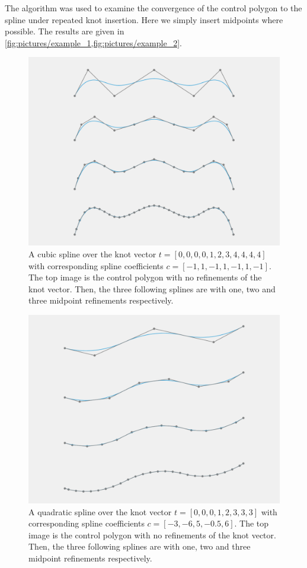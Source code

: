 \documentclass{article}
\begin{document}
    The algorithm was used to examine the convergence of the control polygon to
    the spline under repeated knot insertion. Here we simply insert midpoints
    where possible. The results are given in
    \cref{fig:pictures/example_1,fig:pictures/example_2}.
    \begin{figure}[htpb]
        \centering
        \includegraphics[width=0.8\linewidth]{pictures/example_1.pdf}
        \caption{
            A cubic spline over the knot vector $t = [0, 0, 0, 0, 1, 2, 3, 4,
            4, 4, 4]$ with corresponding spline coefficients $c = [-1, 1, -1,
            1, -1, 1, -1]$. The top image is the control polygon with no
            refinements of the knot vector. Then, the three following splines
            are with one, two and three midpoint refinements respectively.
        }
        \label{fig:pictures/example_1} 
    \end{figure}
\begin{figure}[htpb]
        \centering
        \includegraphics[width=0.8\linewidth]{pictures/example_2.pdf}
        \caption{
            A quadratic spline over the knot vector $t = [0, 0, 0, 1, 2, 3, 3,
            3]$ with corresponding spline coefficients $c = [-3, -6, 5, -0.5,
            6]$. The top image is the control polygon with no refinements of
            the knot vector. Then, the three following splines are with one,
            two and three midpoint refinements respectively.
        }
        \label{fig:pictures/example_2} 
    \end{figure}
\end{document}
